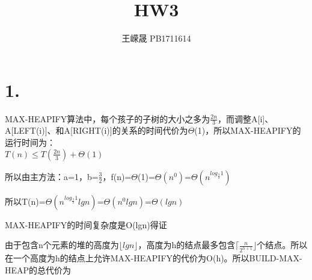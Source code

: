 \documentclass[UTF8]{ctexart}
\title{HW3}
\author{王嵘晟 \quad PB1711614}
\date{}
\begin{document}
	\maketitle
	\section*{1.}
	\par{MAX-HEAPIFY算法中，每个孩子的子树的大小之多为$\frac{2n}{3}$，而调整A[i]、A[LEFT(i)]、和A[RIGHT(i)]的关系的时间代价为$\Theta$(1)，所以MAX-HEAPIFY的运行时间为：}\\
	        $T(n)\le T(\frac{2n}{3})+\Theta(1)$
	\par{所以由主方法：a=1，b=$\frac{3}{2}$，f(n)=$\Theta$(1)=$\Theta(n^{0})$=$\Theta(n^{log_{\frac{3}{2}}1})$}
	\par{所以T(n)=$\Theta(n^{log_{\frac{3}{2}}1}lgn)$=$\Theta(n^{0}lgn)$=$\Theta(lgn)$}
	\par{MAX-HEAPIFY的时间复杂度是O(lgn)得证}\\
	\par{由于包含n个元素的堆的高度为$\lfloor lgn\rfloor$，高度为h的结点最多包含$\lceil\frac{n}{2^{h+1}}\rfloor$个结点。所以在一个高度为h的结点上允许MAX-HEAPIFY的代价为O(h)。所以BUILD-MAX-HEAP的总代价为}
	
\end{document}
